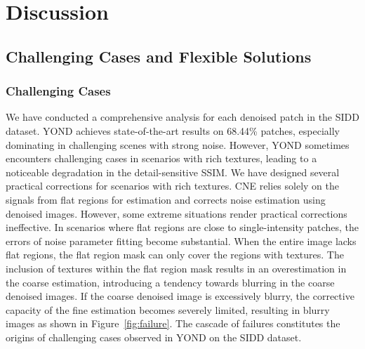 \documentclass[lettersize,journal]{IEEEtran}
\begin{document}
\section{Discussion}\label{sec:discuss}
\subsection{{Challenging Cases and Flexible Solutions}}\label{sec:failure}
\subsubsection{\textbf{Challenging Cases}}
We have conducted a comprehensive analysis for each denoised patch in the SIDD dataset. YOND achieves state-of-the-art results on 68.44\% patches, especially dominating in challenging scenes with strong noise. However, YOND sometimes encounters challenging cases in scenarios with rich textures, leading to a noticeable degradation in the detail-sensitive SSIM.
We have designed several practical corrections for scenarios with rich textures. CNE relies solely on the signals from flat regions for estimation and corrects noise estimation using denoised images. However, some extreme situations render practical corrections ineffective. In scenarios where flat regions are close to single-intensity patches, the errors of noise parameter fitting become substantial. When the entire image lacks flat regions, the flat region mask can only cover the regions with textures. The inclusion of textures within the flat region mask results in an overestimation in the coarse estimation, introducing a tendency towards blurring in the coarse denoised images. If the coarse denoised image is excessively blurry, the corrective capacity of the fine estimation becomes severely limited, resulting in blurry images as shown in Figure~\ref{fig:failure}. The cascade of failures constitutes the origins of challenging cases observed in YOND on the SIDD dataset.
\end{document}
